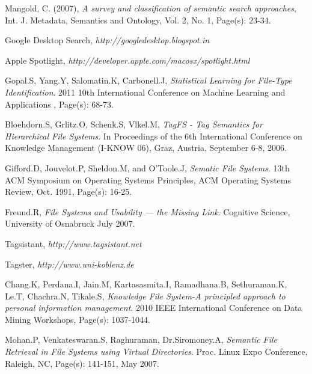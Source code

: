 \begin{thebibliography}{99}



Mangold, C. (2007), 
\emph{A survey and classification of semantic search approaches}, 
Int. J. Metadata, Semantics and Ontology, Vol. 2, No. 1, Page(s): 23-34.

Google Desktop Search,  
\emph{http://googledesktop.blogspot.in}

Apple Spotlight, 
\emph{http://developer.apple.com/macosx/spotlight.html}

Gopal.S, Yang.Y, Salomatin.K, Carbonell.J, 
\emph{Statistical Learning for File-Type Identification}.
2011 10th International Conference on Machine Learning and Applications , Page(s): 68-73.

Bloehdorn.S, Grlitz.O, Schenk.S, Vlkel.M, 
\emph{TagFS - Tag Semantics for Hierarchical File Systems}. 
In Proceedings of the 6th International Conference on Knowledge Management (I-KNOW 06), Graz, Austria, September 6-8, 2006.

 Gifford.D, Jouvelot.P, Sheldon.M, and O’Toole.J, 
\emph{Sematic File Systems}. 
13th ACM Symposium on Operating Systems Principles, ACM Operating Systems Review, Oct. 1991, Page(s): 16-25.

Freund.R, 
\emph{File Systems and Usability — the Missing Link}. 
Cognitive Science, University of Osnabruck
July 2007.

Tagsistant, 
\emph{http://www.tagsistant.net}

Tagster, 
\emph{http://www.uni-koblenz.de}

Chang.K, Perdana.I, Jain.M, Kartasasmita.I, Ramadhana.B, Sethuraman.K, Le.T, Chachra.N, Tikale.S, 
\emph{Knowledge File System-A principled approach to personal information management}.
2010 IEEE International Conference on Data Mining Workshops, 
Page(s): 1037-1044.

Mohan.P, Venkateswaran.S, Raghuraman, Dr.Siromoney.A, 
\emph{Semantic File Retrieval in File Systems using Virtual Directories}.
Proc. Linux Expo Conference, Raleigh, NC, Page(s): 141-151, May 2007.


\end{thebibliography}
